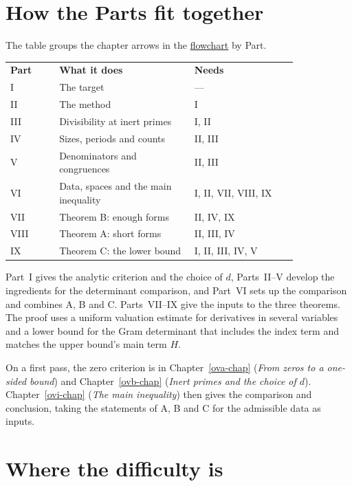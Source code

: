 \documentclass[reqno]{amsart}
\newcounter{chap}
\theoremstyle{definition}
\begin{document}
\section{How the Parts fit together}\label{sec:parts}

The table groups the chapter arrows in the \href{flowchart.html}{flowchart} by Part.

\begin{center}
\begin{tabular}{@{}l p{0.47\linewidth} p{0.36\linewidth}@{}}
  \textbf{Part} & \textbf{What it does} & \textbf{Needs} \\
  I & The target & --- \\
  II & The method & I \\
  III & Divisibility at inert primes & I, II \\
  IV & Sizes, periods and counts & II, III \\
  V & Denominators and congruences & II, III \\
  VI & Data, spaces and the main inequality & I, II, VII, VIII, IX \\
  VII & Theorem B: enough forms & II, IV, IX \\
  VIII & Theorem A: short forms & II, III, IV \\
  IX & Theorem C: the lower bound & I, II, III, IV, V \\
\end{tabular}
\end{center}

Part~I gives the analytic criterion and the choice of \(d\),
Parts~II--V develop the ingredients for the determinant comparison,
and Part~VI sets up the comparison and combines A, B and C.
Parts~VII--IX give the inputs to the three theorems.  The proof
uses a uniform valuation estimate for derivatives in several
variables and a lower bound for the Gram determinant that includes
the index term and matches the upper bound's main term \(H\).

On a first pass, the zero criterion is in Chapter~\ref{ova-chap}
(\emph{From zeros to a one-sided bound}) and Chapter~\ref{ovb-chap}
(\emph{Inert primes and the choice of \(d\)}).  Chapter~\ref{ovi-chap}
(\emph{The main inequality}) then gives the comparison and conclusion,
taking the statements of A, B and C for the admissible data as inputs.

\section{Where the difficulty is}\label{sec:difficulty}
\end{document}
